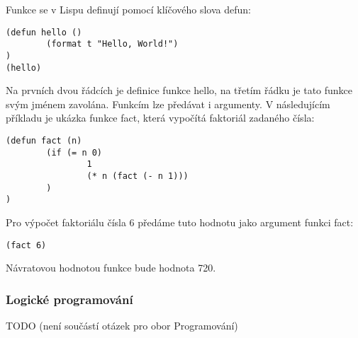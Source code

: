 Funkce se v Lispu definují pomocí klíčového slova defun:
\begin{verbatim}
(defun hello ()
        (format t "Hello, World!")
)
(hello)
\end{verbatim}

Na prvních dvou řádcích je definice funkce hello, na třetím řádku je tato funkce svým jménem zavolána.
Funkcím lze předávat i argumenty. V následujícím příkladu je ukázka funkce fact, která vypočítá faktoriál zadaného čísla:
\begin{verbatim}
(defun fact (n)
        (if (= n 0)
                1
                (* n (fact (- n 1)))
        )
)
\end{verbatim}
Pro výpočet faktoriálu čísla 6 předáme tuto hodnotu jako argument funkci fact:
\begin{verbatim}
(fact 6)
\end{verbatim}
Návratovou hodnotou funkce bude hodnota 720.

\subsubsection*{Logické programování}
TODO (není součástí otázek pro obor Programování)
